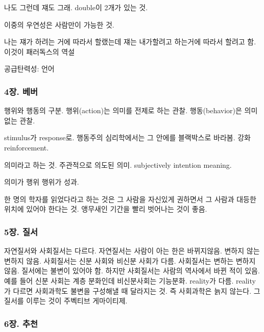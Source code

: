 \documentclass[11pt, a4paper]{article}
\begin{document}
나도 그런데 쟤도 그래. double이 2개가 있는 것.

이중의 우연성은 사람만이 가능한 것. 

나는 쟤가 하려는 거에 따라서 할랬는데 쟤는 내가할려고 하는거에 따라서 할려고 함. 이것이 패러독스의 역설

공급탄력성: 언어

\subsubsection{4장. 베버}

행위와 행동의 구분. 행위(action)는 의미를 전제로 하는 관찰. 행동(behavior)은 의미 없는 관찰.

stimulus가 response로. 행동주의 심리학에서는 그 안에를 블랙박스로 바라봄. 강화 reinforcement. 

의미라고 하는 것. 주관적으로 의도된 의미. subjectively intention meaning. 

의미가 행위 행위가 성과.

한 명의 학자를 읽었다라고 하는 것은 그 사람을 자신있게 권하면서 그 사람과 대등한 위치에 있어야 한다는 것. 앵무새인 기간을 빨리 벗어나는 것이 좋음. 




\subsubsection{5장. 질서}
자연질서와 사회질서는 다르다. 자연질서는 사람이 아는 한은 바뀌지않음. 변하지 않는 변하지 않음. 사회질서는 신분 사회와 비신분 사회가 다름. 사회질서는 변하는 변하지 않음. 질서에는 불변이 있어야 함. 하지만 사회질서는 사람의 역사에서 바뀐 적이 있음. 예를 들어 신분 사회는 계층 분화인데 비신분사회는 기능분화. reality가 다름. reality가 다르면 사회과학도 불변을 구성해낼 때 달라지는 것. 즉 사회과학은 늙지 않는다. 그 질서를 이루는 것이 주벡티브 게마이티제.

\subsubsection{6장. 추천}
\end{document}

